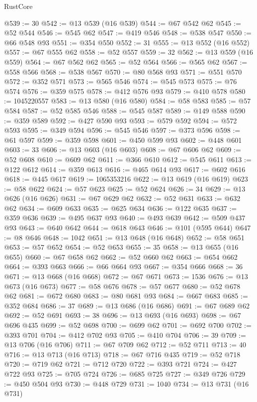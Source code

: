 \begin{lexlean}{RustCore}
\begin{coremodule}
@539 := 30
@542 := @13 @539 (@16 @539)
@544 := @67 @542 @62
@545 := @52 @544
@546 := @545 @62
@547 := @419 @546
@548 := @538 @547
@550 := @66 @548 @93
@551 := @354 @550
@552 := 31
@555 := @13 @552 (@16 @552)
@557 := @67 @555 @62
@558 := @52 @557
@559 := 32
@562 := @13 @559 (@16 @559)
@564 := @67 @562 @62
@565 := @52 @564
@566 := @565 @62
@567 := @558 @566
@568 := @538 @567
@570 := @80 @568 @93
@571 := @551 @570
@572 := @352 @571
@573 := @565 @546
@574 := @545 @573
@575 := @76 @574
@576 := @359 @575
@578 := @412 @576 @93
@579 := @410 @578
@580 := 1045220557
@583 := @13 @580 (@16 @580)
@584 := @58 @583
@585 := @57 @584
@587 := @52 @585 @546
@588 := @545 @587
@589 := @149 @588
@590 := @359 @589
@592 := @427 @590 @93
@593 := @579 @592
@594 := @572 @593
@595 := @349 @594
@596 := @545 @546
@597 := @373 @596
@598 := @61 @597
@599 := @359 @598
@601 := @450 @599 @93
@602 := @448 @601
@603 := 33
@606 := @13 @603 (@16 @603)
@608 := @67 @606 @62
@609 := @52 @608
@610 := @609 @62
@611 := @366 @610
@612 := @545 @611
@613 := @122 @612
@614 := @359 @613
@616 := @465 @614 @93
@617 := @602 @616
@618 := @445 @617
@619 := 1065353216
@622 := @13 @619 (@16 @619)
@623 := @58 @622
@624 := @57 @623
@625 := @52 @624
@626 := 34
@629 := @13 @626 (@16 @626)
@631 := @67 @629 @62
@632 := @52 @631
@633 := @632 @62
@634 := @609 @633
@635 := @625 @634
@636 := @122 @635
@637 := @359 @636
@639 := @495 @637 @93
@640 := @493 @639
@642 := @509 @437 @93
@643 := @640 @642
@644 := @618 @643
@646 := @101 (@595 @644)
@647 := @8 @646
@648 := 1042
@651 := @13 @648 (@16 @648)
@652 := @58 @651
@653 := @57 @652
@654 := @52 @653
@655 := 35
@658 := @13 @655 (@16 @655)
@660 := @67 @658 @62
@662 := @52 @660 @62
@663 := @654 @662
@664 := @393 @663
@666 := @66 @664 @93
@667 := @354 @666
@668 := 36
@671 := @13 @668 (@16 @668)
@672 := @67 @671
@673 := 1536
@676 := @13 @673 (@16 @673)
@677 := @58 @676
@678 := @57 @677
@680 := @52 @678 @62
@681 := @672 @680
@683 := @80 @681 @93
@684 := @667 @683
@685 := @352 @684
@686 := 37
@689 := @13 @686 (@16 @686)
@691 := @67 @689 @62
@692 := @52 @691
@693 := 38
@696 := @13 @693 (@16 @693)
@698 := @67 @696 @435
@699 := @52 @698
@700 := @699 @62
@701 := @692 @700
@702 := @393 @701
@704 := @412 @702 @93
@705 := @410 @704
@706 := 39
@709 := @13 @706 (@16 @706)
@711 := @67 @709 @62
@712 := @52 @711
@713 := 40
@716 := @13 @713 (@16 @713)
@718 := @67 @716 @435
@719 := @52 @718
@720 := @719 @62
@721 := @712 @720
@722 := @393 @721
@724 := @427 @722 @93
@725 := @705 @724
@726 := @685 @725
@727 := @349 @726
@729 := @450 @504 @93
@730 := @448 @729
@731 := 1040
@734 := @13 @731 (@16 @731)

\end{coremodule}
\end{lexlean}
